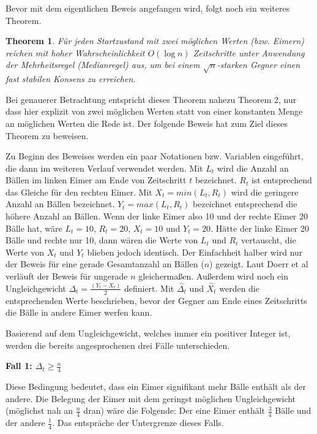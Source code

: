 \documentclass[12pt,ngerman,a4paper]{scrartcl}
\theoremstyle{plain}
\newtheorem{theorem}{Theorem}
\theoremstyle{definition}
\theoremstyle{remark}
\begin{document}
Bevor mit dem eigentlichen Beweis angefangen wird, folgt noch ein weiteres Theorem.

\begin{theorem}
Für jeden Startzustand mit zwei möglichen Werten (bzw. Eimern) reichen mit hoher
Wahrscheinlichkeit $O(\log n)$ Zeitschritte unter Anwendung der Mehrheitsregel
(Medianregel) aus, um bei einem $\sqrt{n}$-starken Gegner einen fast stabilen
Konsens zu erreichen.
\end{theorem}

Bei genauerer Betrachtung entspricht dieses Theorem nahezu Theorem 2, nur dass
hier explizit von zwei möglichen Werten statt von einer konstanten Menge an
möglichen Werten die Rede ist. Der folgende Beweis hat zum Ziel dieses Theorem
zu beweisen.

Zu Beginn des Beweises werden ein paar Notationen bzw. Variablen eingeführt,
die dann im weiteren Verlauf verwendet werden. Mit $L_t$ wird die Anzahl an Bällen
im linken Eimer am Ende von Zeitschritt $t$ bezeichnet. $R_t$ ist entsprechend
das Gleiche für den rechten Eimer. Mit $X_t = min(L_t, R_t)$ wird die geringere
Anzahl an Bällen bezeichnet. $Y_t = max(L_t, R_t)$ bezeichnet entsprechend die
höhere Anzahl an Bällen. Wenn der linke Eimer also 10 und der rechte Eimer 20
Bälle hat, wäre $L_t = 10$, $R_t = 20$, $X_t = 10$ und $Y_t = 20$. Hätte der
linke Eimer 20 Bälle und rechte nur 10, dann wären die Werte von $L_t$ und $R_t$
vertauscht, die Werte von $X_t$ und $Y_t$ blieben jedoch identisch. Der Einfachheit
halber wird nur der Beweis für eine gerade Gesamtanzahl an Bällen ($n$) gezeigt.
Laut Doerr et al verläuft der Beweis für ungerade $n$ gleichermaßen.
Außerdem wird noch ein Ungleichgewicht $\Delta_t = \frac{(Y_t - X_t)}{2}$ definiert.
Mit $\overset{\sim}{\Delta_t}$ und $\overset{\sim}{X_t}$ werden die entsprechenden Werte
beschrieben, bevor der Gegner am Ende eines Zeitschritts die Bälle in andere Eimer
werfen kann.

Basierend auf dem Ungleichgewicht, welches immer ein positiver Integer ist,
werden die bereits angesprochenen drei Fälle unterschieden.

\textbf{Fall 1: \(\Delta_t \geq \frac{n}{4}\)}

Diese Bedingung bedeutet, dass ein Eimer signifikant mehr Bälle enthält als der
andere. Die Belegung der Eimer mit dem geringst möglichen Ungleichgewicht
(möglichst nah an $\frac{n}{4}$ dran) wäre die Folgende:
Der eine Eimer enthält $\frac{3}{4}$ Bälle und der andere $\frac{1}{4}$.
Das entspräche der Untergrenze dieses Falls.
\end{document}
